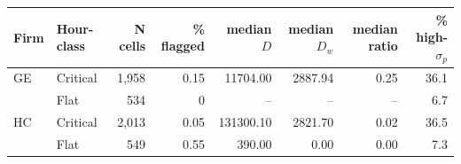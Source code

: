 \begin{tabular}{@{}l l r r r r r r@{}}
\toprule
Firm & Hour-class & N cells & \% flagged & median $D$ & median $D_w$ & median ratio & \% high-$\sigma_{p}$ \\
\midrule
GE & Critical & 1,958 & 0.15 & 11704.00 & 2887.94 & 0.25 & 36.1 \\
 & Flat & 534 & 0 & -- & -- & -- & 6.7 \\
HC & Critical & 2,013 & 0.05 & 131300.10 & 2821.70 & 0.02 & 36.5 \\
 & Flat & 549 & 0.55 & 390.00 & 0.00 & 0.00 & 7.3 \\
\bottomrule
\end{tabular}
